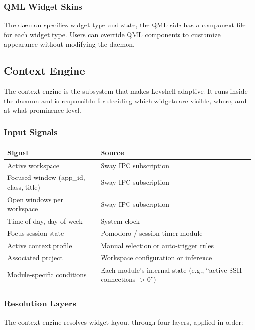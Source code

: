 \documentclass[11pt,a4paper]{article}
\begin{document}
\subsubsection{QML Widget Skins}
The daemon specifies widget type and state; the QML side has a component file for each widget type. Users can override QML components to customize appearance without modifying the daemon.


\subsection{Context Engine}
\label{sec:context-engine}

The context engine is the subsystem that makes Levshell adaptive. It runs inside the daemon and is responsible for deciding which widgets are visible, where, and at what prominence level.

\subsubsection{Input Signals}

\begin{longtable}{p{4.5cm} p{9cm}}
\toprule
\textbf{Signal} & \textbf{Source} \\
\midrule
Active workspace & Sway IPC subscription \\
Focused window (app\_id, class, title) & Sway IPC subscription \\
Open windows per workspace & Sway IPC subscription \\
Time of day, day of week & System clock \\
Focus session state & Pomodoro / session timer module \\
Active context profile & Manual selection or auto-trigger rules \\
Associated project & Workspace configuration or inference \\
Module-specific conditions & Each module's internal state (e.g., ``active SSH connections $> 0$'') \\
\bottomrule
\end{longtable}

\subsubsection{Resolution Layers}

The context engine resolves widget layout through four layers, applied in order:
\end{document}
